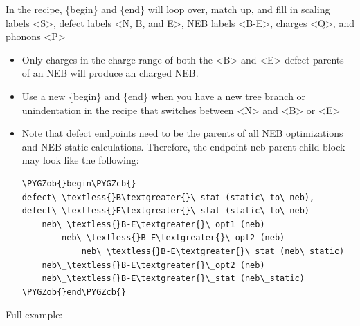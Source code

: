 \documentclass[letterpaper,10pt,english]{sphinxmanual}
\def\PYGZob{\char`\{}
\def\PYGZcb{\char`\}}
\begin{document}
In the recipe, \{begin\} and \{end\} will loop over, match up, and fill in scaling labels \textless{}S\textgreater{}, defect labels \textless{}N, B, and E\textgreater{}, NEB labels \textless{}B-E\textgreater{}, charges \textless{}Q\textgreater{}, and phonons \textless{}P\textgreater{}
\begin{itemize}
\item {} 
Only charges in the charge range of both the \textless{}B\textgreater{} and \textless{}E\textgreater{} defect parents of an NEB will produce an charged NEB.

\item {} 
Use a new \{begin\} and \{end\} when you have a new tree branch or unindentation in the recipe that switches between \textless{}N\textgreater{} and \textless{}B\textgreater{} or \textless{}E\textgreater{}

\item {} 
Note that defect endpoints need to be the parents of all NEB optimizations and NEB static calculations. Therefore, the endpoint-neb parent-child block may look like the following:

\begin{Verbatim}[commandchars=\\\{\}]
\PYGZob{}begin\PYGZcb{}
defect\_\textless{}B\textgreater{}\_stat (static\_to\_neb), defect\_\textless{}E\textgreater{}\_stat (static\_to\_neb)
    neb\_\textless{}B-E\textgreater{}\_opt1 (neb)
        neb\_\textless{}B-E\textgreater{}\_opt2 (neb)
            neb\_\textless{}B-E\textgreater{}\_stat (neb\_static)
    neb\_\textless{}B-E\textgreater{}\_opt2 (neb)
    neb\_\textless{}B-E\textgreater{}\_stat (neb\_static)
\PYGZob{}end\PYGZcb{}
\end{Verbatim}

\end{itemize}

Full example:
\end{document}
